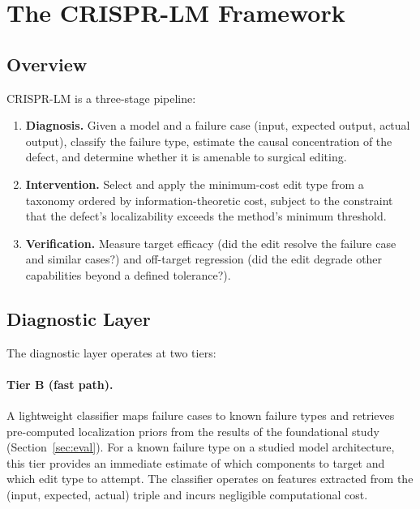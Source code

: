 \documentclass[11pt]{article}
\begin{document}
\section{The CRISPR-LM Framework}

\subsection{Overview}

CRISPR-LM is a three-stage pipeline:

\begin{enumerate}[leftmargin=*]
  \item \textbf{Diagnosis.} Given a model and a failure case (input, expected output, actual output), classify the failure type, estimate the causal concentration of the defect, and determine whether it is amenable to surgical editing.
  \item \textbf{Intervention.} Select and apply the minimum-cost edit type from a taxonomy ordered by information-theoretic cost, subject to the constraint that the defect's localizability exceeds the method's minimum threshold.
  \item \textbf{Verification.} Measure target efficacy (did the edit resolve the failure case and similar cases?) and off-target regression (did the edit degrade other capabilities beyond a defined tolerance?).
\end{enumerate}

\subsection{Diagnostic Layer}

The diagnostic layer operates at two tiers:

\paragraph{Tier B (fast path).} A lightweight classifier maps failure cases to known failure types and retrieves pre-computed localization priors from the results of the foundational study (Section~\ref{sec:eval}). For a known failure type on a studied model architecture, this tier provides an immediate estimate of which components to target and which edit type to attempt. The classifier operates on features extracted from the (input, expected, actual) triple and incurs negligible computational cost.
\end{document}
